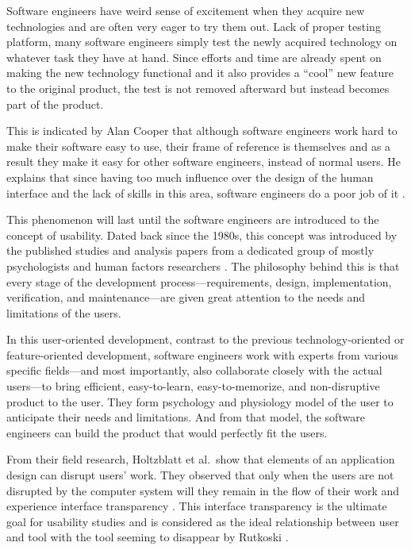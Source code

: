\documentclass{acm_proc_article-sp}
\begin{document}
Software engineers have weird sense of excitement when they acquire
new technologies and are often very eager to try them out. Lack of
proper testing platform, many software engineers simply test the newly
acquired technology on whatever task they have at hand. Since efforts
and time are already spent on making the new technology functional and
it also provides a ``cool'' new feature to the original product, the
test is not removed afterward but instead becomes part of the product.

This is indicated by Alan Cooper that although software engineers work
hard to make their software easy to use, their frame of reference is
themselves and as a result they make it easy for other software
engineers, instead of normal users. He explains that since having too
much influence over the design of the human interface and the lack of
skills in this area, software engineers do a poor job of it
\cite{inmates:cooper}.

This phenomenon will last until the software engineers are introduced
to the concept of usability. Dated back since the 1980s, this concept
was introduced by the published studies and analysis papers from a
dedicated group of mostly psychologists and human factors researchers
\cite{human:rubinstein, friendly:simpson, human:shneiderman,
  human:brown, software:dumas}. The philosophy behind this is that
every stage of the development process---requirements, design,
implementation, verification, and maintenance---are given great
attention to the needs and limitations of the users.

In this user-oriented development, contrast to the previous
technology-oriented or feature-oriented development, software
engineers work with experts from various specific fields---and most
importantly, also collaborate closely with the actual users---to bring
efficient, easy-to-learn, easy-to-memorize, and non-disruptive product
to the user. They form psychology and physiology model of the user to
anticipate their needs and limitations. And from that model, the
software engineers can build the product that would perfectly fit the
users.

From their field research, Holtzblatt et al.\ show that elements of an
application design can disrupt users' work. They observed that only
when the users are not disrupted by the computer system will they
remain in the flow of their work and experience interface transparency
\cite{transparency:holtzblatt}. This interface transparency is the
ultimate goal for usability studies and is considered as the ideal
relationship between user and tool with the tool seeming to disappear
by Rutkoski \cite{transparency:rutkoski}.
\end{document}
